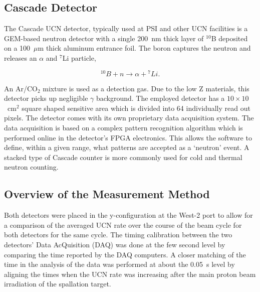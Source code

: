 \documentclass[letter,twocolumn,preprint,3p,numbers,sort&compress]{elsarticle}
\begin{document}
\subsection{Cascade Detector}

The Cascade UCN detector, typically used at PSI and other UCN
facilities is a GEM-based neutron detector with a single 200~nm thick
layer of $^{10}$B deposited on a 100~$\mu$m thick aluminum entrance
foil. The boron captures the neutron and releases an $\alpha$ and
$^7$Li particle,

\begin{equation}
^{10}B + n \rightarrow \alpha + {^7}Li.
\end{equation}

An Ar/CO$_2$ mixture is used as a detection gas.  Due to the low Z
materials, this detector picks up negligible $\gamma$ background. The
employed detector has a $10 \times 10$~cm$^2$ square shaped sensitive
area which is divided into 64 individually read out pixels.  The
detector comes with its own proprietary data acquisition system.  The
data acquisition is based on a complex pattern recognition algorithm
which is performed online in the detector's FPGA electronics.  This
allows the software to define, within a given range, what patterns are
accepted as a `neutron' event.  A stacked type of Cascade counter is
more commonly used for cold and thermal neutron
counting\cite{cascade}.




\subsection{Overview of the Measurement Method}

Both detectors were placed in the y-configuration at the West-2 port
to allow for a comparison of the averaged UCN rate over the course of
the beam cycle for both detectors for the same cycle.  The timing
calibration between the two detectors' Data AcQuisition (DAQ) was done
at the few second level by comparing the time reported by the DAQ
computers.  A closer matching of the time in the analysis of the data
was performed at about the 0.05~s level by aligning the times when the
UCN rate was increasing after the main proton beam irradiation of the
spallation target.
\end{document}
